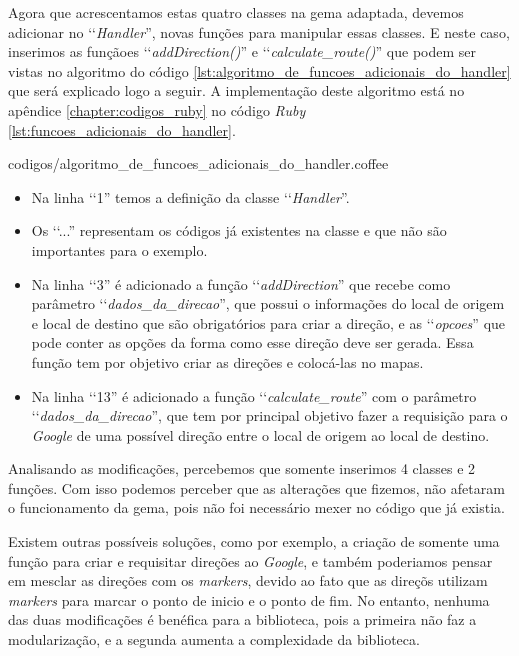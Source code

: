 Agora que acrescentamos estas quatro classes na gema adaptada, devemos adicionar no ‘‘\emph{Handler}'',
novas funções para manipular essas classes. E neste caso, inserimos as funçãoes ‘‘\emph{addDirection()}'' e
‘‘\emph{calculate\_route()}'' que podem ser vistas no algoritmo do código
\ref{lst:algoritmo_de_funcoes_adicionais_do_handler} que será explicado logo a seguir. A implementação deste
algoritmo está no apêndice \ref{chapter:codigos_ruby} no código \emph{Ruby}
\ref{lst:funcoes_adicionais_do_handler}.


{codigos/algoritmo_de_funcoes_adicionais_do_handler.coffee}

\begin{itemize}

 \item Na linha ‘‘1'' temos a definição da classe ‘‘\emph{Handler}''.

 \item Os ‘‘...'' representam os códigos já existentes na classe e que não são importantes para o
 exemplo.

 \item Na linha ‘‘3'' é adicionado a função ‘‘\emph{addDirection}'' que recebe como parâmetro
 ‘‘\emph{dados\_da\_direcao}'', que possui o informações do local de origem e local de destino que são
 obrigatórios para criar a direção, e as ‘‘\emph{opcoes}'' que pode conter as opções da forma
 como esse direção deve ser gerada. Essa função tem por objetivo criar as direções e colocá-las no mapas.

 \item Na linha ‘‘13'' é adicionado a função ‘‘\emph{calculate\_route}'' com o parâmetro
 ‘‘\emph{dados\_da\_direcao}'', que tem por principal objetivo fazer a requisição para o \emph{Google} de uma
 possível direção entre o local de origem ao local de destino.

\end{itemize}

Analisando as modificações, percebemos que somente inserimos 4 classes e 2 funções. Com isso podemos
perceber que as alterações que fizemos, não afetaram o funcionamento da gema, pois não foi
necessário mexer no código que já existia.

Existem outras possíveis soluções, como por exemplo, a criação de somente uma função para criar e
requisitar direções ao \emph{Google}, e também poderiamos pensar em mesclar as direções com os
\emph{markers}, devido ao fato que as direçõs utilizam \emph{markers} para marcar o ponto de inicio e
o ponto de fim. No entanto, nenhuma das duas modificações é benéfica para a biblioteca, pois a primeira
não faz a modularização, e a segunda aumenta a complexidade da biblioteca.


